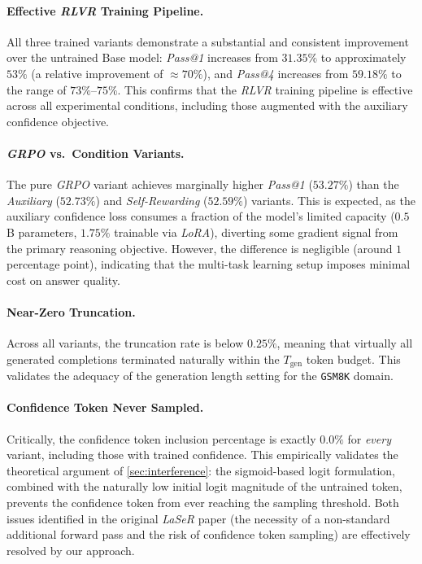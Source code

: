 \documentclass[a4paper,oneside,10pt,ngerman,english]{scrartcl}
\begin{document}
\paragraph{Effective \textit{RLVR} Training Pipeline.}
All three trained variants demonstrate a substantial and consistent improvement over the untrained Base model: \textit{Pass@1} increases from $31.35\%$ to approximately $53\%$ (a relative improvement of $\approx 70\%$), and \textit{Pass@4} increases from $59.18\%$ to the range of $73\%$--$75\%$. This confirms that the \textit{RLVR} training pipeline is effective across all experimental conditions, including those augmented with the auxiliary confidence objective.

\paragraph{\textit{GRPO} vs.\ Condition Variants.}
The pure \textit{GRPO} variant achieves marginally higher \textit{Pass@1} ($53.27\%$) than the \textit{Auxiliary} ($52.73\%$) and \textit{Self-Rewarding} ($52.59\%$) variants. This is expected, as the auxiliary confidence loss consumes a fraction of the model's limited capacity ($0.5\,$B parameters, $1.75\%$ trainable via \textit{LoRA}), diverting some gradient signal from the primary reasoning objective. However, the difference is negligible (around $1$ percentage point), indicating that the multi-task learning setup imposes minimal cost on answer quality.

\paragraph{Near-Zero Truncation.}
Across all variants, the truncation rate is below $0.25\%$, meaning that virtually all generated completions terminated naturally within the $T_{\mathrm{gen}}$ token budget. This validates the adequacy of the generation length setting for the \texttt{GSM8K} domain.

\paragraph{Confidence Token Never Sampled.}
Critically, the confidence token inclusion percentage is exactly $0.0\%$ for \textit{every} variant, including those with trained confidence. This empirically validates the theoretical argument of \autoref{sec:interference}: the sigmoid-based logit formulation, combined with the naturally low initial logit magnitude of the untrained token, prevents the confidence token from ever reaching the sampling threshold. Both issues identified in the original \textit{LaSeR} paper \citep{laser} (the necessity of a non-standard additional forward pass and the risk of confidence token sampling) are effectively resolved by our approach.
\end{document}
